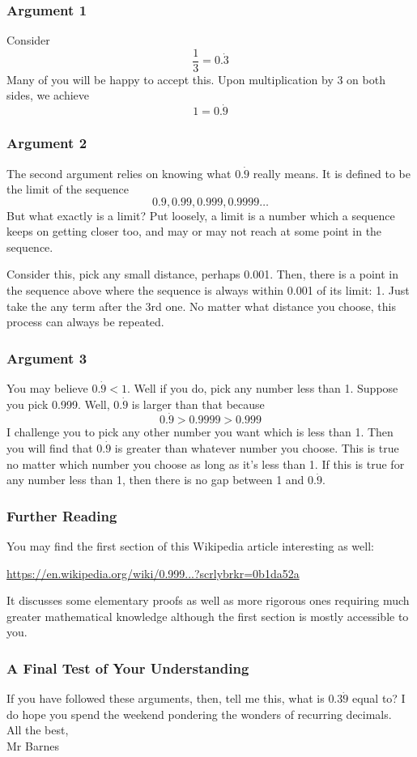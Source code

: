 \documentclass{article}
\begin{document}
\subsubsection*{Argument 1}

Consider
\[
\frac{1}{3}=0.\dot{3}
\]
Many of you will be happy to accept this. Upon multiplication by 3 on both sides, we achieve
\[
1 = 0.\dot{9}
\]

\subsubsection*{Argument 2}

The second argument relies on knowing what $0.\dot{9}$ really means. It is defined to be the limit of the sequence
\[
0.9, 0.99, 0.999, 0.9999 \dots
\]
But what exactly is a limit? Put loosely, a limit is a number which a sequence keeps on getting closer too, and may or may not reach at some point in the sequence. 

Consider this, pick any small distance, perhaps 0.001. Then, there is a point in the sequence above where the sequence is always within 0.001 of its limit: 1. Just take the any term after the 3rd one. No matter what distance you choose, this process can always be repeated.

\subsubsection*{Argument 3}

You may believe $0.\dot{9}<1$. Well if you do, pick any number less than 1. Suppose you pick 0.999. Well,  \(0.\dot{9}\) is larger than that because
\[
0.\dot{9} > 0.9999 > 0.999
\]
I challenge you to pick any other number you want which is less than 1. Then you will find that \(0.\dot{9}\) is greater than whatever number you choose. This is true no matter which number you choose as long as it's less than 1. If this is true for any number less than 1, then there is no gap between 1 and \(0.\dot{9}\).

\subsubsection*{Further Reading}

You may find the first section of this Wikipedia article interesting as well:

\url{https://en.wikipedia.org/wiki/0.999...?scrlybrkr=0b1da52a}

It discusses some elementary proofs as well as more rigorous ones requiring much greater mathematical knowledge although the first section is mostly accessible to you.

\subsubsection*{A Final Test of Your Understanding}

If you have followed these arguments, then, tell me this, what is $0.3\dot{9}$ equal to? I do hope you spend the weekend pondering the wonders of recurring decimals.
\\

\hfill All the best, \\

\hfill Mr Barnes
\end{document}

